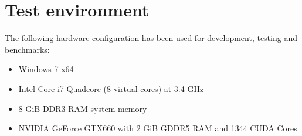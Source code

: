 \section{Test environment}
\label{sec:test_environment}

The following hardware configuration has been used for development, testing and benchmarks:

\begin{itemize}
	\item Windows 7 x64
	\item Intel Core i7 Quadcore (8 virtual cores) at 3.4 GHz
	\item 8 GiB DDR3 RAM system memory
	\item NVIDIA GeForce GTX660 with 2 GiB GDDR5 RAM and 1344 CUDA Cores
\end{itemize}
